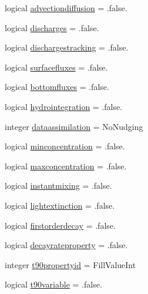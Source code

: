 \begin{DoxyCompactItemize}
\item 
logical \mbox{\hyperlink{structmodulewaterproperties_1_1t__evolution_aa28e3451e8ec74d07429fd56e9273ad8}{advectiondiffusion}} = .false.
\item 
logical \mbox{\hyperlink{structmodulewaterproperties_1_1t__evolution_ad65ec76bd9888ae5f97e2fee19a3d334}{discharges}} = .false.
\item 
logical \mbox{\hyperlink{structmodulewaterproperties_1_1t__evolution_a5f85fd54cbd66d6fd051854d46acd5cc}{dischargestracking}} = .false.
\item 
logical \mbox{\hyperlink{structmodulewaterproperties_1_1t__evolution_afb9837e1a5398ee4d62d1b8b38f99805}{surfacefluxes}} = .false.
\item 
logical \mbox{\hyperlink{structmodulewaterproperties_1_1t__evolution_a88c85acfadbeb7dd9e68c20dae54f688}{bottomfluxes}} = .false.
\item 
logical \mbox{\hyperlink{structmodulewaterproperties_1_1t__evolution_a4c5277c8630e36f422872f88a4710603}{hydrointegration}} = .false.
\item 
integer \mbox{\hyperlink{structmodulewaterproperties_1_1t__evolution_a2976e4c50add66e3bf646a16063508f0}{dataassimilation}} = No\+Nudging
\item 
logical \mbox{\hyperlink{structmodulewaterproperties_1_1t__evolution_a552921d04fe077ecdb596ee3c493138b}{minconcentration}} = .false.
\item 
logical \mbox{\hyperlink{structmodulewaterproperties_1_1t__evolution_acab7f4e747ef81ba9c215b1384d73b19}{maxconcentration}} = .false.
\item 
logical \mbox{\hyperlink{structmodulewaterproperties_1_1t__evolution_a2af9fbbbf615c9ec3a128cc03389b399}{instantmixing}} = .false.
\item 
logical \mbox{\hyperlink{structmodulewaterproperties_1_1t__evolution_a44f3016676f26fbf98718bf9f4ceead1}{lightextinction}} = .false.
\item 
logical \mbox{\hyperlink{structmodulewaterproperties_1_1t__evolution_a729b5a29c82ddfab9e889c37e08ac88f}{firstorderdecay}} = .false.
\item 
logical \mbox{\hyperlink{structmodulewaterproperties_1_1t__evolution_a9074920c5581fa4708f6a792c67071a3}{decayrateproperty}} = .false.
\item 
integer \mbox{\hyperlink{structmodulewaterproperties_1_1t__evolution_a466c8309e7608382ec986518d2c562da}{t90propertyid}} = Fill\+Value\+Int
\item 
logical \mbox{\hyperlink{structmodulewaterproperties_1_1t__evolution_a8bbce511e5638e5e0e3d63d0558d9b64}{t90variable}} = .false.

\end{DoxyCompactItemize}
